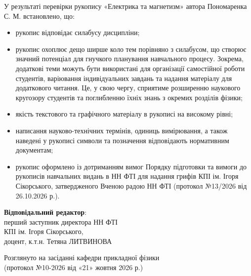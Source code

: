 \documentclass[14pt,a4paper]{extarticle}
\begin{document}
\vspace{0.5em}
\noindent У результаті перевірки рукопису «Електрика та магнетизм» автора Пономаренка С. М. встановлено, що:
\begin{itemize}
    \item[--] рукопис відповідає силабусу дисципліни;
    \item[--] рукопис охоплює дещо ширше коло тем порівняно з силабусом, що створює значний потенціал для гнучкого планування навчального процесу. Зокрема, додаткові теми можуть бути використані для організації самостійної роботи студентів, варіювання індивідуальних завдань та надання матеріалу для додаткового читання. Це, у свою чергу, сприятиме розширенню наукового кругозору студентів та поглибленню їхніх знань з окремих розділів фізики;
    \item[--] якість текстового та графічного матеріалу в рукописі на високому рівні;
    \item[--] написання науково-технічних термінів, одиниць вимірювання, а також наведені у рукописі символи та позначення відповідають нормативним документам;
    \item[--] рукопис оформлено із дотриманням вимог Порядку підготовки та вимоги до рукописів навчальних видань в НН ФТІ для надання грифів КПІ ім. Ігоря Сікорського, затвердженого Вченою радою НН ФТІ (протокол №13/2026 від 26.10.2026 р.).
\end{itemize}

\vspace{4em}

\noindent
\textbf{Відповідальний редактор}:\\
перший заступник директора НН ФТІ\\ КПІ ім. Ігоря Сікорського,\\
доцент, к.т.н. \hfill Тетяна ЛИТВИНОВА

\vspace{3em}

\noindent Розглянуто на засіданні кафедри прикладної фізики\\
(протокол №10-2026 від «21» жовтня 2026 р.)
\end{document}
